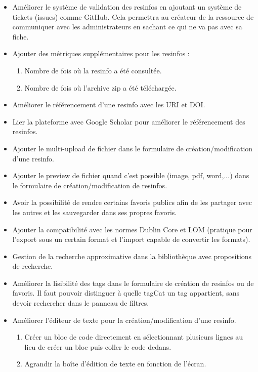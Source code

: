 \begin{itemize}
    \item Améliorer le système de validation des \glspl{resinfo} en ajoutant un système de tickets (issues) comme GitHub. Cela permettra au créateur de la ressource de communiquer avec les administrateurs en sachant ce qui ne va pas avec sa \gls{fiche}.
    \item Ajouter des métriques supplémentaires pour les \glspl{resinfo} :
    \begin{enumerate}
        \item Nombre de fois où la \gls{resinfo} a été consultée.
        \item Nombre de fois où l'archive zip a été téléchargée.
    \end{enumerate}
    \item Améliorer le référencement d'une \gls{resinfo} avec les URI et DOI.
    \item Lier la plateforme avec Google Scholar pour améliorer le référencement des \glspl{resinfo}.
    \item Ajouter le multi-upload de fichier dans le formulaire de création/modification d'une \gls{resinfo}.
    \item Ajouter le preview de fichier quand c'est possible (image, pdf, word,...) dans le formulaire de création/modification de \glspl{resinfo}.
    \item Avoir la possibilité de rendre certains favoris publics afin de les partager avec les autres et les sauvegarder dans ses propres favoris.
    \item Ajouter la compatibilité avec les normes Dublin Core et LOM (pratique pour l'export sous un certain format et l'import capable de convertir les formats).
    \item Gestion de la recherche approximative dans la bibliothèque avec propositions de recherche.
    \item Améliorer la lisibilité des \glspl{tag} dans le formulaire de création de \glspl{resinfo} ou de favoris. Il faut pouvoir distinguer à quelle \gls{tagCat} un \gls{tag} appartient, sans devoir rechercher dans le panneau de filtres.
    \item Améliorer l'éditeur de texte pour la création/modification d'une \gls{resinfo}.
    \begin{enumerate}
        \item Créer un bloc de code directement en sélectionnant plusieurs lignes au lieu de créer un bloc puis coller le code dedans.
        \item Agrandir la boîte d'édition de texte en fonction de l'écran.

\end{enumerate}
\end{itemize}
